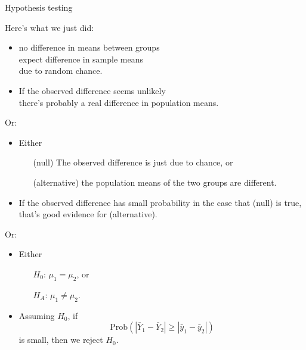 \begin{frame}{Hypothesis testing}

    Here's what we just did:
    \begin{itemize}
      \item {} no difference in means between groups\\
         expect  difference in sample means\\
            due to random chance.
        \item If the observed difference \alert{seems unlikely} \\
            there's probably a real difference in population means.
    \end{itemize}

     \vspace{1em}
     \pause

     Or:
     \begin{itemize}
         \item Either
             \begin{itemize}
                 \item[(null)] The observed difference is just due to chance, or
                 \item[(alternative)] the population means of the two groups are different.
             \end{itemize}
         \item If the observed difference has \alert{small probability}
             in the case that (null) is true, that's good evidence for (alternative).
     \end{itemize}

     \vspace{1em}
     \pause

     Or:
     \begin{itemize}
         \item Either
             \begin{itemize}
                 \item[$H_0$:] $\mu_1 = \mu_2$, or
                 \item[$H_A$:] $\mu_1 \neq \mu_2$.
             \end{itemize}
         \item Assuming $H_0$, if
             \[ \text{Prob}( |\bar Y_1 - \bar Y_2| \ge |\bar y_1 - \bar y_2| ) \]
             is small, then we \alert{reject} $H_0$.
     \end{itemize}

\end{frame}


